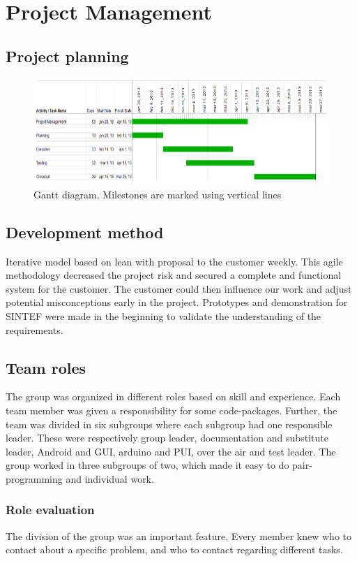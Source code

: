 \chapter{Project Management}

\section{Project planning}
\begin{figure}[H]
\includegraphics[scale=0.8]{images/gantt-diagram.png}
\caption{Gantt diagram. Milestones are marked using vertical lines}
\end{figure}

\section{Development method}
Iterative model based on lean with proposal to the customer weekly. This agile methodology decreased the project risk and secured a complete and functional system for the customer. The customer could then influence our work and adjust potential misconceptions early in the project. Prototypes and demonstration for SINTEF were made in the beginning to validate the understanding of the requirements.

\section{Team roles}
The group was organized in different roles based on skill and experience. Each team member was given a responsibility for some code-packages. Further, the team was divided in six subgroups where each subgroup had one responsible leader. These were respectively group leader, documentation and substitute leader, Android and GUI, arduino and PUI, over the air and test leader. The group worked in three subgroups of two, which made it easy to do pair-programming and individual work.

\subsection{Role evaluation}
The division of the group was an important feature. Every member knew who to contact about a specific problem, and who to contact regarding different tasks.\\


